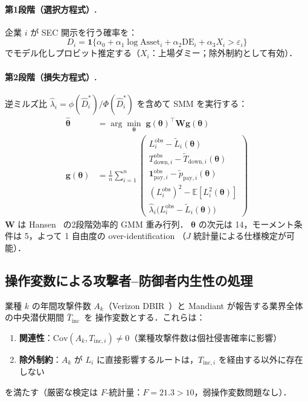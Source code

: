 \documentclass{ipsjlike}
\newcommand{\E}{\mathbb{E}}
\newcommand{\ind}{\mathbf{1}}
\newcommand{\btheta}{\bm{\theta}}
\newcommand{\hattheta}{\hat{\bm{\theta}}}
\begin{document}
\paragraph{第1段階（選択方程式）.}
企業 $i$ が SEC 開示を行う確率を：
\begin{equation}
  D_i = \ind\!\bigl\{
    \alpha_0 + \alpha_1 \log\mathrm{Asset}_i + \alpha_2 \mathrm{DE}_i + \alpha_3 X_i > \varepsilon_i
  \bigr\}
  \label{eq:selection}
\end{equation}
でモデル化しプロビット推定する（$X_i$：上場ダミー；除外制約として有効）．

\paragraph{第2段階（損失方程式）.}
逆ミルズ比 $\hat{\lambda}_i = \phi(\hat{D}_i^*)/\Phi(\hat{D}_i^*)$ を含めて
SMM を実行する：
\begin{align}
  \hattheta &= \arg\min_{\btheta} \;\bm{g}(\btheta)^\top \bm{W} \bm{g}(\btheta)
  \label{eq:smm} \\
  \bm{g}(\btheta) &= \frac{1}{n}\sum_{i=1}^n
  \begin{pmatrix}
    L_i^{\mathrm{obs}} - \tilde{L}_i(\btheta) \\
    T_{\mathrm{down},i}^{\mathrm{obs}} - \tilde{T}_{\mathrm{down},i}(\btheta) \\
    \ind_{\mathrm{pay},i}^{\mathrm{obs}} - \tilde{p}_{\mathrm{pay},i}(\btheta) \\
    (L_i^{\mathrm{obs}})^2 - \E[L_i^2(\btheta)] \\
    \hat{\lambda}_i \bigl(L_i^{\mathrm{obs}} - \tilde{L}_i(\btheta)\bigr)
  \end{pmatrix}
  \label{eq:moments}
\end{align}
$\bm{W}$ は Hansen~\cite{hansen1982} の2段階効率的 GMM 重み行列．
$\btheta$ の次元は 14，モーメント条件は 5，よって 1 自由度の over-identification
（$J$ 統計量による仕様検定が可能）．

\subsection{操作変数による攻撃者--防御者内生性の処理}
\label{sec:iv}

\begin{assumption}[操作変数]\label{ass:iv}
  業種 $k$ の年間攻撃件数 $A_k$（Verizon DBIR~\cite{verizon2024}）と
  Mandiant が報告する業界全体の中央潜伏期間 $\bar{T}_{\mathrm{inc}}$~\cite{mandiant2024}を
  操作変数とする．これらは：
  \begin{enumerate}[leftmargin=1.5em, topsep=1pt, itemsep=0pt, label=(\roman*)]
    \item \textbf{関連性}：$\mathrm{Cov}(A_k, T_{\mathrm{inc},i}) \neq 0$（業種攻撃件数は個社侵害確率に影響）
    \item \textbf{除外制約}：$A_k$ が $L_i$ に直接影響するルートは，$T_{\mathrm{inc},i}$ を経由する以外に存在しない
  \end{enumerate}
  を満たす（厳密な検定は $F$-統計量：$F = 21.3 > 10$，弱操作変数問題なし）．
\end{assumption}
\end{document}
